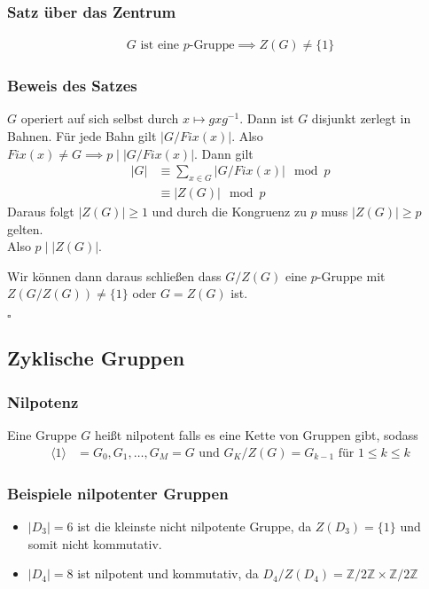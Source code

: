 \documentclass[12pt, german]{article}
\newcommand{\bewiesen}{
	
	\begin{flushright}
		$\square$  \\
\end{flushright}}
\begin{document}
	\subsubsection{Satz über das Zentrum}
	\begin{align*}
		G \text{ ist eine $p$-Gruppe} \implies Z(G) \not = \{1\}
	\end{align*}
	
	\subsubsection{Beweis des Satzes}
	$G$ operiert auf sich selbst durch $x \mapsto gxg^{-1}$. Dann ist $G$ disjunkt zerlegt in Bahnen. Für jede Bahn gilt $|G/Fix(x)|$. 
	Also $Fix(x) \not= G \implies p \mid |G/Fix(x)|$. Dann gilt 
	\begin{align*}
		|G| &\equiv \sum_{x \in G} |G/Fix(x)|  \mod p\\
		&\equiv |Z(G) |\mod p
	\end{align*}
	Daraus folgt $|Z(G)| \geq 1$ und durch die Kongruenz zu $p$ muss $|Z(G)|\geq p$ gelten. \\
	Also $p \mid |Z(G)|$. 
	\newline
	
	Wir können dann daraus schließen dass $G/Z(G)$ eine $p$-Gruppe mit $Z(G/Z(G)) \not = \{1\}$ oder $G=Z(G)$ ist.
	\bewiesen
	
	\subsection{Zyklische Gruppen}
	\subsubsection{Nilpotenz}
	Eine Gruppe $G$ heißt nilpotent falls es eine Kette von Gruppen gibt, sodass
	\begin{align*}
		\langle 1 \rangle &= G_0, G_1, \ldots, G_M = G  \text{ und } G_K/Z(G) = G_{k-1} \text{ für } 1 \leq k \leq k
	\end{align*}
	
	\subsubsection{Beispiele nilpotenter Gruppen}
	\begin{itemize}
		\item $|D_3| = 6$ ist die kleinste nicht nilpotente Gruppe, da $Z(D_3) = \{1\}$ und somit nicht kommutativ.
		\item $|D_4| = 8$ ist nilpotent und kommutativ, da $D_4/Z(D_4) = \mathbb Z/2 \mathbb Z \times \mathbb Z /2\mathbb Z$
	\end{itemize}
	
\end{document}
